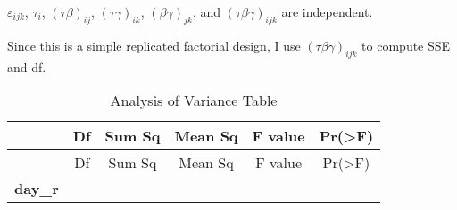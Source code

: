 \documentclass[12pt,]{article}
\begin{document}
\(\varepsilon_{ijk}\), \(\tau_{i}\), \((\tau\beta)_{ij}\),
\((\tau\gamma)_{ik}\), \((\beta\gamma)_{jk}\), and
\((\tau\beta\gamma)_{ijk}\) are independent.

Since this is a simple replicated factorial design, I use
\((\tau\beta\gamma)_{ijk}\) to compute SSE and df.

\begin{longtable}[]{@{}cccccc@{}}
\caption{Analysis of Variance Table}\tabularnewline
\toprule
\begin{minipage}[b]{0.22\columnwidth}\centering
~\strut
\end{minipage} & \begin{minipage}[b]{0.06\columnwidth}\centering
Df\strut
\end{minipage} & \begin{minipage}[b]{0.10\columnwidth}\centering
Sum Sq\strut
\end{minipage} & \begin{minipage}[b]{0.12\columnwidth}\centering
Mean Sq\strut
\end{minipage} & \begin{minipage}[b]{0.12\columnwidth}\centering
F value\strut
\end{minipage} & \begin{minipage}[b]{0.14\columnwidth}\centering
Pr(\textgreater{}F)\strut
\end{minipage}\tabularnewline
\midrule
\endfirsthead
\toprule
\begin{minipage}[b]{0.22\columnwidth}\centering
~\strut
\end{minipage} & \begin{minipage}[b]{0.06\columnwidth}\centering
Df\strut
\end{minipage} & \begin{minipage}[b]{0.10\columnwidth}\centering
Sum Sq\strut
\end{minipage} & \begin{minipage}[b]{0.12\columnwidth}\centering
Mean Sq\strut
\end{minipage} & \begin{minipage}[b]{0.12\columnwidth}\centering
F value\strut
\end{minipage} & \begin{minipage}[b]{0.14\columnwidth}\centering
Pr(\textgreater{}F)\strut
\end{minipage}\tabularnewline
\midrule
\endhead
\begin{minipage}[t]{0.22\columnwidth}\centering
\textbf{day\_r}\strut
\end{minipage} & \begin{minipage}[t]{0.06\columnwidth}\centering

\end{minipage}
\end{longtable}
\end{document}

